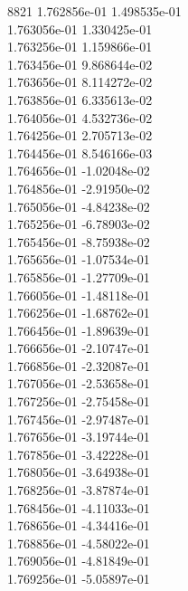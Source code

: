 8821	1.762856e-01	1.498535e-01	\\ 	1.763056e-01	1.330425e-01	\\ 	1.763256e-01	1.159866e-01	\\ 	1.763456e-01	9.868644e-02	\\ 	1.763656e-01	8.114272e-02	\\ 	1.763856e-01	6.335613e-02	\\ 	1.764056e-01	4.532736e-02	\\ 	1.764256e-01	2.705713e-02	\\ 	1.764456e-01	8.546166e-03	\\ 	1.764656e-01	-1.02048e-02	\\ 	1.764856e-01	-2.91950e-02	\\ 	1.765056e-01	-4.84238e-02	\\ 	1.765256e-01	-6.78903e-02	\\ 	1.765456e-01	-8.75938e-02	\\ 	1.765656e-01	-1.07534e-01	\\ 	1.765856e-01	-1.27709e-01	\\ 	1.766056e-01	-1.48118e-01	\\ 	1.766256e-01	-1.68762e-01	\\ 	1.766456e-01	-1.89639e-01	\\ 	1.766656e-01	-2.10747e-01	\\ 	1.766856e-01	-2.32087e-01	\\ 	1.767056e-01	-2.53658e-01	\\ 	1.767256e-01	-2.75458e-01	\\ 	1.767456e-01	-2.97487e-01	\\ 	1.767656e-01	-3.19744e-01	\\ 	1.767856e-01	-3.42228e-01	\\ 	1.768056e-01	-3.64938e-01	\\ 	1.768256e-01	-3.87874e-01	\\ 	1.768456e-01	-4.11033e-01	\\ 	1.768656e-01	-4.34416e-01	\\ 	1.768856e-01	-4.58022e-01	\\ 	1.769056e-01	-4.81849e-01	\\ 	1.769256e-01	-5.05897e-01	\\ \hline
